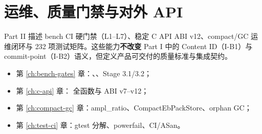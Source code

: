 \part{运维、质量门禁与对外 API}
\label{part:ops}

Part II 描述 bench CI 硬门禁（L1--L7）、稳定 C API ABI v12、compact/GC 运维闭环与 232 项测试矩阵。这些能力\textbf{不改变} Part I 中的 Content ID（I-B1）与 commit-point（I-B2）语义，但定义产品可交付的质量标准与集成契约。

\begin{itemize}[nosep]
  \item 第 \ref{ch:bench-gates} 章：、、Stage 3.1/3.2；
  \item 第 \ref{ch:c-api} 章： 全函数与 ABI v7--v12；
  \item 第 \ref{ch:compact-gc} 章：ampl\_ratio、CompactEbPackStore、orphan GC；
  \item 第 \ref{ch:test-ci} 章：gtest 分解、powerfail、CI/ASan。
\end{itemize}
